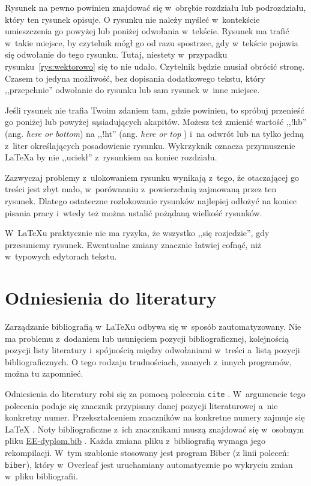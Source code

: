 Rysunek na pewno powinien znajdować się w~obrębie rozdziału lub podrozdziału, który ten rysunek opisuje. O rysunku nie
należy myśleć w~kontekście umieszczenia go powyżej lub poniżej odwołania w~tekście. Rysunek ma trafić w~takie miejsce,
by czytelnik mógł go od razu spostrzec, gdy w~tekście pojawia się odwołanie do tego rysunku. Tutaj, niestety w~przypadku
rysunku~\ref{rys:wektorowo}
się to nie udało. Czytelnik będzie musiał obrócić stronę. Czasem to jedyna możliwość, bez dopisania dodatkowego tekstu,
który ,,przepchnie'' odwołanie do rysunku lub sam rysunek w~inne miejsce.

Jeśli rysunek nie trafia Twoim zdaniem tam, gdzie powinien, to spróbuj przenieść go poniżej lub powyżej sąsiadujących
akapitów. Możesz też zmienić wartość ,,!hb'' (ang. \textit{here or bottom}) na ,,!ht'' (ang. \textit{here or top}
) i~na odwrót lub na tylko jedną z~liter określających posadowienie rysunku. Wykrzyknik oznacza przymuszenie \LaTeX{a}
by nie ,,uciekł'' z~rysunkiem na koniec rozdziału.

Zazwyczaj problemy z~ulokowaniem rysunku wynikają z~tego, że otaczającej go treści jest zbyt mało, w~porównaniu
z~powierzchnią zajmowaną przez ten rysunek. Dlatego ostateczne rozlokowanie rysunków najlepiej odłożyć na koniec pisania
pracy i~wtedy też można ustalić pożądaną wielkość rysunków.

W~\LaTeX{u}
praktycznie nie ma ryzyka, że wszystko ,,się rozjedzie'', gdy przesuniemy rysunek. Ewentualne zmiany znacznie łatwiej
cofnąć, niż w~typowych edytorach tekstu.



\section{Odniesienia do literatury}
Zarządzanie bibliografią w~\LaTeX{u}
odbywa się w~sposób zautomatyzowany. Nie ma problemu z~dodaniem lub usunięciem pozycji bibliograficznej, kolejnością
pozycji listy literatury i~spójnością między odwołaniami w~treści a~listą pozycji bibliograficznych. O tego rodzaju
trudnościach, znanych z~innych programów, można tu zapomnieć.

Odniesienia do literatury robi się za pomocą polecenia \texttt{cite}
. W~argumencie tego polecenia podaje się znacznik przypisany danej pozycji literaturowej a~nie konkretny numer.
Przekształceniem znaczników na konkretne numery zajmuje się \LaTeX{}
. Noty bibliograficzne z~ich znacznikami muszą znajdować się w~osobnym pliku \href{./EE-dyplom.bib}{EE-dyplom.bib}
. Każda zmiana pliku z~bibliografią wymaga jego rekompilacji. W~tym szablonie stosowany jest program Biber (z linii
poleceń: \texttt{biber}), który w~Overleaf jest uruchamiany automatycznie po wykryciu zmian w~pliku bibliografii.

